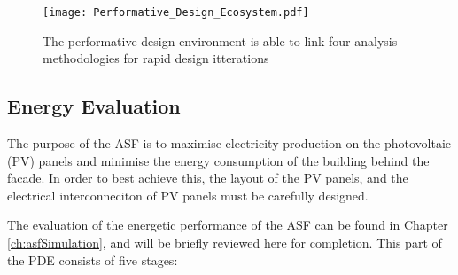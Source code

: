 \begin{figure}
\begin{center}
\texttt{[image: Performative\_Design\_Ecosystem.pdf]}
\caption{The performative design environment is able to link four analysis methodologies for rapid design itterations}
\label{fig:performative}
\end{center}
\end{figure}

\subsection{Energy Evaluation}
\label{ch:energy}

The purpose of the ASF is to maximise electricity production on the photovoltaic (PV) panels and minimise the energy consumption of the building behind the facade. In order to best achieve this, the layout of the PV panels, and the electrical interconneciton of PV panels must be carefully designed.

The evaluation of the energetic performance of the ASF can be found in Chapter \ref{ch:asfSimulation}, and will be briefly reviewed here for completion. This part of the PDE consists of five stages: 

